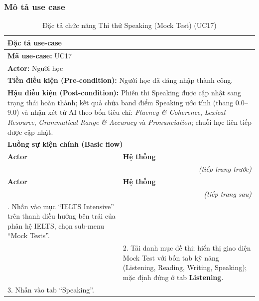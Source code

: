 \subsubsection{Mô tả use case}
\renewcommand{\arraystretch}{1.3}
\setlength{\tbu}{\dimexpr(\linewidth - 4\tabcolsep - 3\arrayrulewidth)/2\relax}
\begin{longtable}{|p{\tbu}|p{\tbu}|}
    \caption{Đặc tả chức năng Thi thử Speaking (Mock Test) (UC17)} \label{tab:uc17_spec} \\
    
    \hline
    \multicolumn{2}{|l|}{\textbf{Đặc tả use-case}} \\ \hline
    \multicolumn{2}{|l|}{\textbf{Mã use-case:} UC17} \\ \hline
    \multicolumn{2}{|l|}{\textbf{Actor:} Người học} \\ \hline
    \multicolumn{2}{|p{\dimexpr\linewidth - 2\tabcolsep - 2\arrayrulewidth\relax}|}{\textbf{Tiền điều kiện (Pre-condition):} Người học đã đăng nhập thành công.} \\ \hline
    \multicolumn{2}{|p{\dimexpr\linewidth - 2\tabcolsep - 2\arrayrulewidth\relax}|}{\textbf{Hậu điều kiện (Post-condition):} Phiên thi Speaking được cập nhật sang trạng thái hoàn thành; kết quả chứa band điểm Speaking ước tính (thang 0.0--9.0) và nhận xét từ AI theo bốn tiêu chí: \textit{Fluency \& Coherence}, \textit{Lexical Resource}, \textit{Grammatical Range \& Accuracy} và \textit{Pronunciation}; chuỗi học liên tiếp được cập nhật.} \\ \hline
    \multicolumn{2}{|l|}{\textbf{Luồng sự kiện chính (Basic flow)}} \\ \hline
    \textbf{Actor} & \textbf{Hệ thống} \\ \hline
    \endfirsthead
    \multicolumn{2}{r}{\textit{(tiếp trang trước)}} \\
    \hline
    \textbf{Actor} & \textbf{Hệ thống} \\ \hline
    \endhead
    \hline
    \multicolumn{2}{r}{\textit{(tiếp trang sau)}} \\
    \endfoot
    \endlastfoot
    1. Nhấn vào mục ``IELTS Intensive'' trên thanh điều hướng bên trái của phân hệ IELTS, chọn sub-menu ``Mock Tests''. & \\ \hline
    & 2. Tải danh mục đề thi; hiển thị giao diện Mock Test với bốn tab kỹ năng (Listening, Reading, Writing, Speaking); mặc định đứng ở tab \textbf{Listening}. \\ \hline
    3. Nhấn vào tab ``Speaking''. & \\ \hline

\end{longtable}
